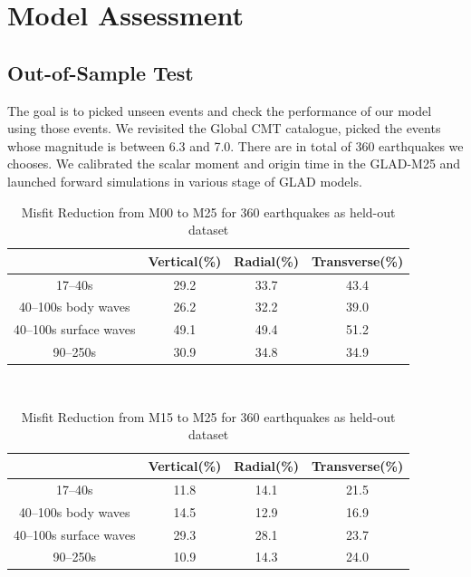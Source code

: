 \documentclass[extra,mreferee]{gji}
\begin{document}
\section{Model Assessment}

\subsection{Out-of-Sample Test}

The goal is to picked unseen events and check the performance of our model using those events. We revisited the Global CMT catalogue, picked the events whose magnitude is between 6.3 and 7.0. There are in total of 360 earthquakes we chooses. We calibrated the scalar moment and origin time in the GLAD-M25 and launched forward simulations in various stage of GLAD models.

\begin{table}[!htb]
  \centering
  \begin{tabular}{|c|c|c|c|}
    \hline
    ~          &  Vertical(\%) & Radial(\%) &  Transverse(\%) \\
    \hline
    17--40s                &         29.2 &       33.7 &       43.4 \\
    40--100s body waves    &         26.2 &       32.2 &       39.0 \\
    40--100s surface waves &         49.1 &       49.4 &       51.2 \\
    90--250s               &         30.9 &       34.8 &       34.9 \\
    \hline
  \end{tabular}\\
  \caption{Misfit Reduction from M00 to M25 for 360 earthquakes as held-out dataset}
  \label{table:misfit_reduction_M00_M25_360}
\end{table}

\begin{table}[!htb]
  \centering
  \begin{tabular}{|c|c|c|c|}
  \hline
  ~          &  Vertical(\%) & Radial(\%) &  Transverse(\%) \\
  \hline
  17--40s                &          11.8 &       14.1 &       21.5 \\
  40--100s body waves    &          14.5 &       12.9 &       16.9 \\
  40--100s surface waves &          29.3 &       28.1 &       23.7 \\
  90--250s               &          10.9 &       14.3 &       24.0 \\
  \hline
  \end{tabular}\\
  \caption{Misfit Reduction from M15 to M25 for 360 earthquakes as held-out dataset}
  \label{table:misfit_reduction_M15_M25_360}
\end{table}
\end{document}
